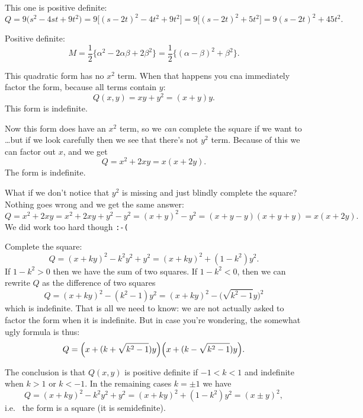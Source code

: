 \item[{\bfseries(III5.5d)}]

This one is positive definite:
\[
  Q
  = 9\bigl( s^2 - 4st + 9 t^2\bigr)
  = 9\bigl[ (s - 2t)^2 -4t^2 + 9 t^2\bigr]
  = 9\bigl[ (s - 2t)^2 + 5 t^2\bigr]
  =9(s-2t)^2 + 45 t^2.
\]
\bigskip

\item[{\bfseries(III5.5e)}]

Positive definite:
\[
  M = \frac12\bigl\{\alpha^2- 2\alpha\beta + 2\beta^2\bigr\}
  =\frac12 \bigl\{(\alpha-\beta)^2 + \beta^2\bigr\}.
\]
\bigskip

\item[{\bfseries(III5.5f)}]

This quadratic form has no $x^2$ term.  When that happens you cna immediately factor
the form, because all terms contain $y$:
\[
Q(x,y) = xy+y^2 = (x+y)y.
\]
This form is indefinite.
\bigskip

\item[{\bfseries(III5.5g)}]

Now this form does have an $x^2$ term, so we \textit{can} complete the square if we
want to \dots but if we look carefully then we see that there's not $y^2$ term.
Because of this we can factor out $x$, and we get
\[
  Q = x^2+2xy = x(x+2y).
\]
The form is indefinite.

What if we don't notice that $y^2$ is missing and just blindly complete the square?
Nothing goes wrong and we get the same answer:
\[
  Q = x^2+2xy = x^2+ 2xy +y^2 - y^2 = (x+y)^2 - y^2 = (x+y - y)(x+y+y) = x(x+2y).
\]
We did work too hard though \verb|:-(|
\bigskip

\item[{\bfseries(III5.6)}]

Complete the square:
\[
  Q=(x+ky)^2 - k^2 y^2 + y^2
   =(x+ky)^2 + (1- k^2) y^2.
\]
If $1-k^2>0$ then we have the sum of two squares.  If $1-k^2<0$, then we can rewrite
$Q$ as the difference of two squares
\[
   Q=(x+ky)^2 - (k^2-1) y^2
   =(x+ky)^2 - \bigl(\sqrt{k^2-1}y\bigr)^2
\]
which is indefinite.  That is all we need to know: we are not actually asked to
factor the form when it is indefinite.  But in case you're wondering, the somewhat
ugly formula is thus:
\[
  Q = \Bigl(x+(k+\sqrt{k^2-1}) y\Bigr) \Bigl(x+(k-\sqrt{k^2-1}) y\Bigr).
\]

The conclusion is that $Q(x,y)$ is positive definite if $-1<k<1$ and indefinite when
$k>1$ or $k<-1$.  In the remaining cases $k=\pm1$ we have
\[
  Q=(x+ky)^2 - k^2 y^2 + y^2
   =(x+ky)^2 + (1- k^2) y^2 = (x\pm y)^2,
\]
i.e.~ the form is a square (it is semidefinite).
\bigskip

